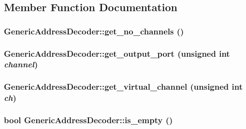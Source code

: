\subsection{Member Function Documentation}
\hypertarget{classGenericAddressDecoder_339ae939c2361faac88813f1af3ce796}{
\subsubsection[{get\_\-no\_\-channels}]{ GenericAddressDecoder::get\_\-no\_\-channels ()}}
\label{classGenericAddressDecoder_339ae939c2361faac88813f1af3ce796}


\hypertarget{classGenericAddressDecoder_3bab82f615b42ee907d37a6f601bd527}{
\subsubsection[{get\_\-output\_\-port}]{ GenericAddressDecoder::get\_\-output\_\-port (unsigned int {\em channel})}}
\label{classGenericAddressDecoder_3bab82f615b42ee907d37a6f601bd527}


\hypertarget{classGenericAddressDecoder_99bfff56c04910dd0e3e397f8168d489}{
\subsubsection[{get\_\-virtual\_\-channel}]{ GenericAddressDecoder::get\_\-virtual\_\-channel (unsigned int {\em ch})}}
\label{classGenericAddressDecoder_99bfff56c04910dd0e3e397f8168d489}


\hypertarget{classGenericAddressDecoder_c11da10c5593e9677c0a19b6dfea46d8}{
\subsubsection[{is\_\-empty}]{\setlength{\rightskip}{0pt plus 5cm}bool GenericAddressDecoder::is\_\-empty ()}}
\label{classGenericAddressDecoder_c11da10c5593e9677c0a19b6dfea46d8}


